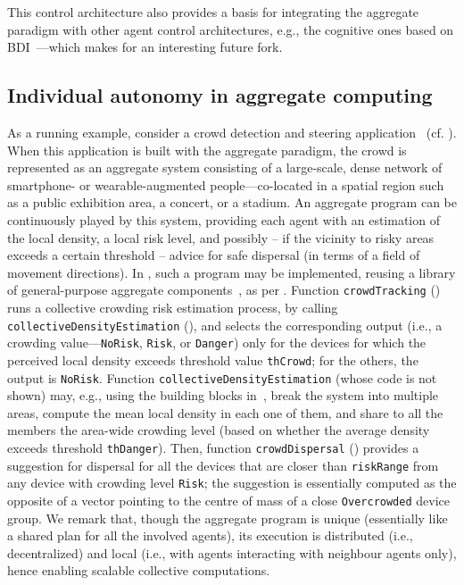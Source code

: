 This control architecture also provides a basis for integrating the aggregate paradigm 
 with other agent control architectures, e.g., the cognitive ones based on BDI~\cite{desilva2020bdi}---which makes for an interesting future fork.


\subsection{Individual autonomy in aggregate computing}
\label{mdpi2020:contrib-individual-autonomy}

As a running example, consider a crowd detection and steering application~\cite{DBLP:journals/computer/BealPV15} (cf. ).
%
When this application is built with the aggregate paradigm, the crowd is represented as an aggregate system consisting of 
 a large-scale, dense network of smartphone- or wearable-augmented people---co-located in a spatial region such as a public exhibition area, a concert, or a stadium.
%
An aggregate program can be continuously played by this system,
 providing each agent with 
 an estimation of the local density,
 a local risk level,
 and possibly -- if the vicinity to risky areas exceeds a certain threshold -- advice for safe dispersal (in terms of a field of movement directions).
%
In \scafi{}, such a program may be implemented, reusing a library of general-purpose aggregate components~\cite{DBLP:conf/saso/BealV14a}, %
 as per . 
%
Function \lstinline|crowdTracking| ()
 runs
 a collective crowding risk estimation process,
 by calling \lstinline|collectiveDensityEstimation| (),
 and selects the corresponding output (i.e., a crowding value---\lstinline|NoRisk|, \lstinline|Risk|, or \lstinline|Danger|)
 only for the devices for which the perceived local density
 exceeds threshold value \lstinline|thCrowd|;
 for the others, the output is \lstinline|NoRisk|.
%
Function \lstinline|collectiveDensityEstimation| (whose code is not shown)
 may, e.g., using the building blocks in~\cite{DBLP:conf/saso/BealV14a}, break the system into multiple areas, compute the mean local density in each one of them, and share to all the members the area-wide crowding level (based on whether the average density exceeds threshold \lstinline|thDanger|).
%
Then, function \lstinline|crowdDispersal| ()
 provides a suggestion for dispersal
 for all the devices that are closer than \lstinline|riskRange|
 from any device with crowding level \lstinline|Risk|;
 the suggestion is essentially computed as the opposite
 of a vector pointing to the centre of mass of a close 
 \lstinline|Overcrowded| device group.
%
We remark that, 
 though the aggregate program is unique (essentially like a shared plan for all the involved agents),
 its execution is distributed (i.e., decentralized)
 and local (i.e., with agents interacting with neighbour agents only),
 hence enabling scalable collective computations.
 

